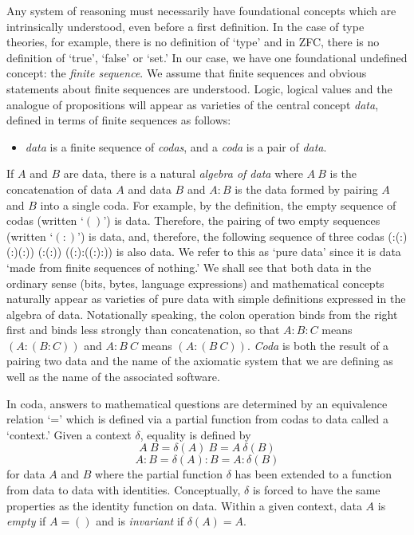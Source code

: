 \documentclass[11pt]{article}
\begin{document}
     Any system of reasoning must necessarily have foundational concepts which are intrinsically understood, even before a first definition.  
In the case of type theories\cite{Type,HOTT,aldor}, for example, there is no definition of `type' and in ZFC\cite{ZFC}, there is no definition of `true', `false' or `set.'  
In our case, we have one foundational undefined concept:  
the {\it finite sequence}.  We assume that finite sequences and obvious statements about finite sequences are understood.  Logic, 
logical values and the analogue of propositions will appear as varieties of the central concept  {\it data}, defined in terms 
of finite sequences as follows: 
\begin{itemize}
\item {\it data} is a finite sequence of {\it codas}, and a {\it coda} is a pair of {\it data}. 
\end{itemize}
If $A$ and $B$ are data, there is a natural {\it algebra of data} where $A\ B$ is the concatenation of data $A$ and data $B$ and $A:B$ is  
the data formed by pairing $A$ and $B$ into a single coda.  For example, by the definition, the empty sequence of codas (written `$()$') is data.  Therefore,
the pairing of two empty sequences (written `$(:)$') is data, and, therefore, the following sequence of three codas (:(:)(:)(:)) (:(:)) ((:):((:):)) is also data.  
We refer to this as `pure data' since it is data `made from finite sequences of nothing.'   
We shall see that both data in the ordinary sense (bits, bytes, language expressions) and mathematical concepts naturally appear as varieties 
of pure data with simple definitions expressed in the algebra of data.  Notationally speaking, the colon operation binds from the right first and binds 
less strongly than concatenation, so that $A:B:C$ means $(A:(B:C))$ and $A:B\ C$ means $(A:(B\ C))$.  {\it Coda} is both the result of a pairing 
two data and the name of the axiomatic system that we are defining as well as the name of the associated software\cite{github}.  

     In coda, answers to mathematical questions are determined by an equivalence relation `=' which is defined via a partial function from codas to data
called a `context.'  Given a context $\delta$, equality is defined by
\begin{equation} 
	A\ B = \delta(A)\ B = A\ \delta(B)
\end{equation}
\begin{equation} 
	A:B = \delta(A):B = A:\delta(B)
\end{equation}
for data $A$ and $B$ where the partial function $\delta$ has been extended to a function from data to data with identities.
Conceptually, $\delta$ is forced to have the same properties as the identity function on data.  Within a given context, 
data $A$ is {\it empty} if $A=()$ and is {\it invariant} if $\delta(A)=A$.
\end{document}

